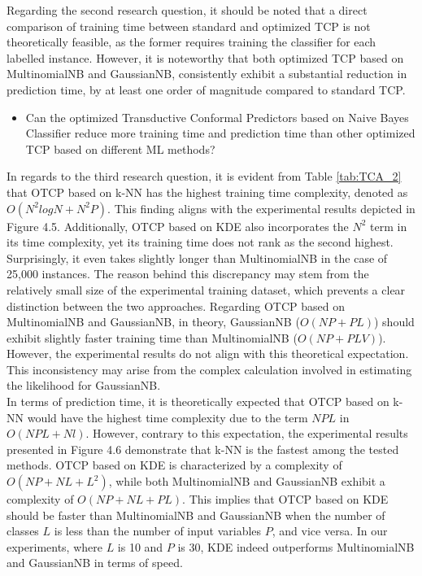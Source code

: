 \documentclass[10pt]{reportMaster}
\begin{document}
\noindent Regarding the second research question, it should be noted that a direct comparison of training time between standard and optimized TCP is not theoretically feasible, as the former requires training the classifier for each labelled instance. However, it is noteworthy that both optimized TCP based on MultinomialNB and GaussianNB, consistently exhibit a substantial reduction in prediction time, by at least one order of magnitude compared to standard TCP.

\begin{itemize}
\item Can the optimized Transductive Conformal Predictors based on Naive Bayes Classifier reduce more training time and prediction time than other optimized TCP based on different ML methods?
\end{itemize}

\noindent In regards to the third research question, it is evident from Table \ref{tab:TCA_2} that OTCP based on k-NN has the highest training time complexity, denoted as $O(N^2logN + N^2P)$. This finding aligns with the experimental results depicted in Figure 4.5. Additionally, OTCP based on KDE also incorporates the $N^2$ term in its time complexity, yet its training time does not rank as the second highest. Surprisingly, it even takes slightly longer than MultinomialNB in the case of 25,000 instances. The reason behind this discrepancy may stem from the relatively small size of the experimental training dataset, which prevents a clear distinction between the two approaches. Regarding OTCP based on MultinomialNB and GaussianNB, in theory, GaussianNB ($O(NP+PL)$) should exhibit slightly faster training time than MultinomialNB ($O(NP+PLV)$). However, the experimental results do not align with this theoretical expectation. This inconsistency may arise from the complex calculation involved in estimating the likelihood for GaussianNB.\\

\noindent  In terms of prediction time, it is theoretically expected that OTCP based on k-NN would have the highest time complexity due to the term $NPL$ in $O(NPL+Nl)$. However, contrary to this expectation, the experimental results presented in Figure 4.6 demonstrate that k-NN is the fastest among the tested methods. OTCP based on KDE is characterized by a complexity of $O(NP+NL+L^2)$, while both MultinomialNB and GaussianNB exhibit a complexity of $O(NP+NL+PL)$. This implies that OTCP based on KDE should be faster than MultinomialNB and GaussianNB when the number of classes $L$ is less than the number of input variables $P$, and vice versa. In our experiments, where $L$ is 10 and $P$ is 30, KDE indeed outperforms MultinomialNB and GaussianNB in terms of speed.\\
\end{document}
